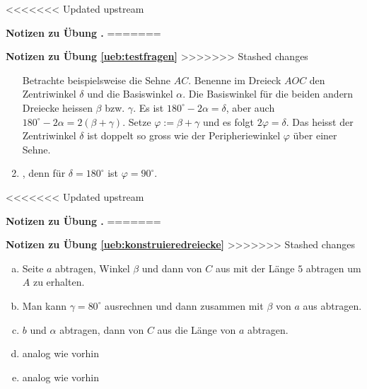 \documentclass[%
11pt,%
twoside,%
titlepage,%
swissgerman,%
headsepline%
]{scrartcl}
\newcommand{\faReturnGray}{\textcolor{gray}{\faMailReply}} %
\theoremstyle{definition}
\theoremstyle{plain}
\newcommand{\concatueb}[1]{ueb:#1}%
\newcommand{\concatlsg}[1]{lsg:#1}%
\newcounter{uebcounter}[section]
\renewcommand{\theuebcounter}{\thesection.\arabic{uebcounter}}  %
\newenvironment{lsg}[1]{%
<<<<<<< Updated upstream
    \par\noindent\textbf{Notizen zu Übung \theuebcounter\label{\concatlsg{#1}}}
=======
    \par\noindent\textbf{Notizen zu Übung \ref{\concatueb{#1}}}\label{\concatlsg{#1}}
>>>>>>> Stashed changes
    \hfill\hyperref[\concatueb{#1}]{\faReturnGray}\par %
}{%
    \par%
}
\begin{document}
\begin{lsg}{testfragen}
\begin{enumerate}
        \begin{center}
        \end{center}

        Betrachte beispielsweise die Sehne $AC$. Benenne im Dreieck $AOC$ den Zentriwinkel $\delta$ und die Basiswinkel $\alpha$. Die Basiswinkel für die beiden andern Dreiecke heissen $\beta$ bzw. $\gamma$. Es ist $180^\circ-2\alpha=\delta$, aber auch $180^\circ-2\alpha=2(\beta+\gamma)$. Setze $\varphi:=\beta+\gamma$ und es folgt $2\varphi=\delta$. Das heisst der Zentriwinkel $\delta$ ist doppelt so gross wie der Peripheriewinkel $\varphi$ über einer Sehne.
        \item {}, denn für $\delta=180^\circ$ ist $\varphi=90^\circ$.
    \end{enumerate}
\end{lsg}
\begin{lsg}{konstruieredreiecke}
    \begin{enumerate}[a)]
        \item Seite $a$ abtragen, Winkel $\beta$ und dann von $C$ aus mit der Länge $5$ abtragen um $A$ zu erhalten.
        \item Man kann $\gamma=80^\circ$ ausrechnen und dann zusammen mit $\beta$ von $a$ aus abtragen.
        \item $b$ und $\alpha$ abtragen, dann von $C$ aus die Länge von $a$ abtragen.
        \item analog wie vorhin
        \item analog wie vorhin
    \end{enumerate}
\end{lsg}
\end{document}
